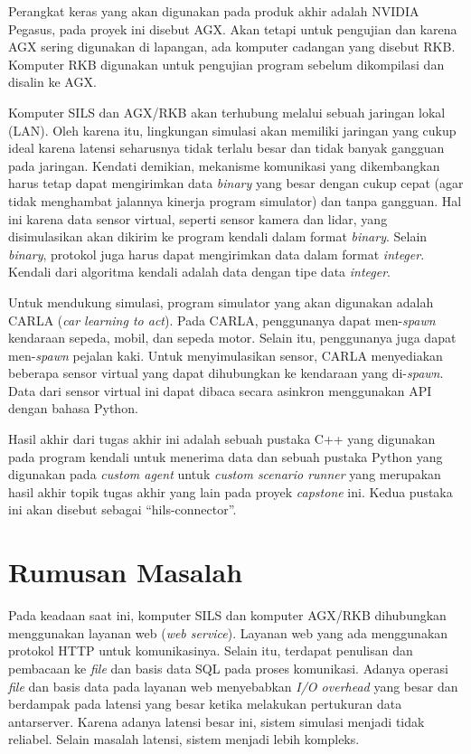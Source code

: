 Perangkat keras yang akan digunakan pada produk akhir adalah NVIDIA Pegasus,
pada proyek ini disebut AGX. Akan tetapi untuk pengujian dan karena AGX sering
digunakan di lapangan, ada komputer cadangan yang disebut RKB. Komputer RKB
digunakan untuk pengujian program sebelum dikompilasi dan disalin ke AGX.

Komputer SILS dan AGX/RKB akan terhubung melalui sebuah jaringan lokal (LAN).
Oleh karena itu, lingkungan simulasi akan memiliki jaringan yang cukup ideal
karena latensi seharusnya tidak terlalu besar dan tidak banyak gangguan pada
jaringan. Kendati demikian, mekanisme komunikasi yang dikembangkan harus tetap
dapat mengirimkan data \textit{binary} yang besar dengan cukup cepat (agar tidak
menghambat jalannya kinerja program simulator) dan tanpa gangguan. Hal ini
karena data sensor virtual, seperti sensor kamera dan lidar, yang disimulasikan
akan dikirim ke program kendali dalam format \textit{binary}. Selain
\textit{binary}, protokol juga harus dapat mengirimkan data dalam format
\textit{integer}. Kendali dari algoritma kendali adalah data dengan tipe data
\textit{integer}.

Untuk mendukung simulasi, program simulator yang akan digunakan adalah CARLA
(\textit{car learning to act}). Pada CARLA, penggunanya dapat men-\textit{spawn}
kendaraan sepeda, mobil, dan sepeda motor. Selain itu, penggunanya juga dapat
men-\textit{spawn} pejalan kaki. Untuk menyimulasikan sensor, CARLA menyediakan
beberapa sensor virtual yang dapat dihubungkan ke kendaraan yang
di-\textit{spawn}. Data dari sensor virtual ini dapat dibaca secara asinkron
menggunakan API dengan bahasa Python.

Hasil akhir dari tugas akhir ini adalah sebuah pustaka C++ yang digunakan pada
program kendali untuk menerima data dan sebuah pustaka Python yang digunakan
pada \textit{custom agent} untuk \textit{custom scenario runner} yang merupakan
hasil akhir topik tugas akhir yang lain pada proyek \textit{capstone} ini. Kedua
pustaka ini akan disebut sebagai ``hils-connector''.

\section{Rumusan Masalah}

Pada keadaan saat ini, komputer SILS dan komputer AGX/RKB dihubungkan
menggunakan layanan web (\textit{web service}). Layanan web yang ada menggunakan
protokol HTTP untuk komunikasinya. Selain itu, terdapat penulisan dan pembacaan
ke \textit{file} dan basis data SQL pada proses komunikasi. Adanya operasi
\textit{file} dan basis data pada layanan web menyebabkan \textit{I/O overhead}
yang besar dan berdampak pada latensi yang besar ketika melakukan pertukuran
data antarserver. Karena adanya latensi besar ini, sistem simulasi menjadi tidak
reliabel. Selain masalah latensi, sistem menjadi lebih kompleks.

